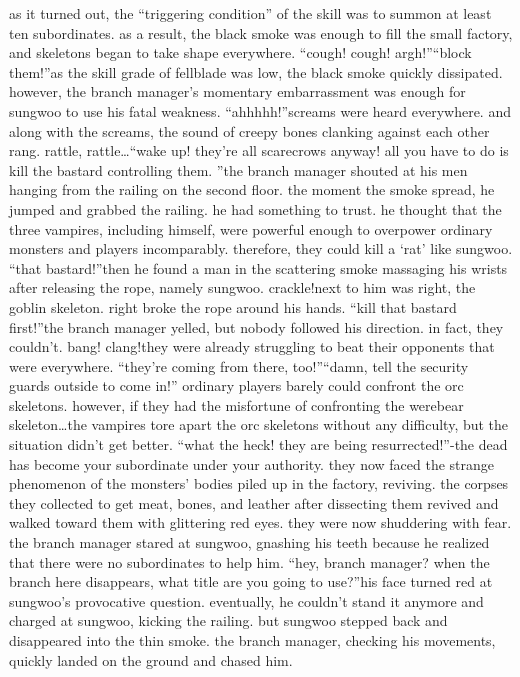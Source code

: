 as it turned out, the “triggering condition” of the skill was to summon at least ten subordinates.
 as a result, the black smoke was enough to fill the small factory, and skeletons began to take shape everywhere.
“cough! cough! argh!”“block them!”as the skill grade of fellblade was low, the black smoke quickly dissipated.
 however, the branch manager’s momentary embarrassment was enough for sungwoo to use his fatal weakness.
“ahhhhh!”screams were heard everywhere.
 and along with the screams, the sound of creepy bones clanking against each other rang.
rattle, rattle…“wake up! they’re all scarecrows anyway! all you have to do is kill the bastard controlling them.
”the branch manager shouted at his men hanging from the railing on the second floor.
the moment the smoke spread, he jumped and grabbed the railing.
 he had something to trust.
 he thought that the three vampires, including himself, were powerful enough to overpower ordinary monsters and players incomparably.
 therefore, they could kill a ‘rat’ like sungwoo.
“that bastard!”then he found a man in the scattering smoke massaging his wrists after releasing the rope, namely sungwoo.
crackle!next to him was right, the goblin skeleton.
 right broke the rope around his hands.
“kill that bastard first!”the branch manager yelled, but nobody followed his direction.
 in fact, they couldn’t.
bang! clang!they were already struggling to beat their opponents that were everywhere.
“they’re coming from there, too!”“damn, tell the security guards outside to come in!”
ordinary players barely could confront the orc skeletons.
 however, if they had the misfortune of confronting the werebear skeleton…the vampires tore apart the orc skeletons without any difficulty, but the situation didn’t get better.
“what the heck! they are being resurrected!”-the dead has become your subordinate under your authority.
they now faced the strange phenomenon of the monsters’ bodies piled up in the factory, reviving.
 the corpses they collected to get meat, bones, and leather after dissecting them revived and walked toward them with glittering red eyes.
 they were now shuddering with fear.
the branch manager stared at sungwoo, gnashing his teeth because he realized that there were no subordinates to help him.
“hey, branch manager? when the branch here disappears, what title are you going to use?”his face turned red at sungwoo’s provocative question.
eventually, he couldn’t stand it anymore and charged at sungwoo, kicking the railing.
 but sungwoo stepped back and disappeared into the thin smoke.
 the branch manager, checking his movements, quickly landed on the ground and chased him.
